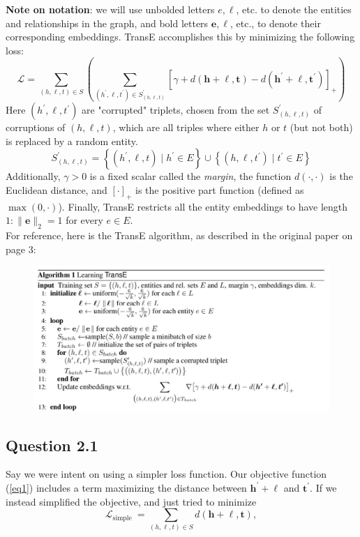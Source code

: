 \documentclass{article}
\begin{document}
\textbf{Note on notation}: we will use unbolded letters $e, \ell$, etc. to denote the entities and relationships in the graph, and bold letters $\mathbf{e}, \boldsymbol{\ell}$, etc., to denote their corresponding embeddings.
TransE accomplishes this by minimizing the following loss:
\begin{equation}\label{eq1}
\mathcal{L}=\sum_{(h, \ell, t) \in S}\left(\sum_{\left(h^{\prime}, \ell, t^{\prime}\right) \in S_{(h, \ell, t)}^{\prime}}\left[\gamma+d(\mathbf{h}+\boldsymbol{\ell}, \mathbf{t})-d\left(\mathbf{h}^{\prime}+\boldsymbol{\ell}, \mathbf{t}^{\prime}\right)\right]_{+}\right)
\end{equation}
Here $\left(h^{\prime}, \ell, t^{\prime}\right)$ are "corrupted" triplets, chosen from the set $S_{(h, \ell, t)}^{\prime}$ of corruptions of $(h, \ell, t)$, which are all triples where either $h$ or $t$ (but not both) is replaced by a random entity.
$$
S_{(h, \ell, t)}^{\prime}=\left\{\left(h^{\prime}, \ell, t\right) \mid h^{\prime} \in E\right\} \cup\left\{\left(h, \ell, t^{\prime}\right) \mid t^{\prime} \in E\right\}
$$
Additionally, $\gamma>0$ is a fixed scalar called the \textit{margin}, the function $d(\cdot, \cdot)$ is the Euclidean distance, and $[\cdot]_{+}$ is the positive part function (defined as $\max (0, \cdot)$). Finally, TransE restricts all the entity embeddings to have length $1:\|\mathbf{e}\|_2=1$ for every $e \in E$.\\
For reference, here is the TransE algorithm, as described in the original paper on page 3:
\begin{figure}[H]
    \centering
    \includegraphics[width=1.0\textwidth]{algo2.png}
\end{figure}

\subsection*{Question 2.1}
Say we were intent on using a simpler loss function. Our objective function (\ref{eq1}) includes a term maximizing the distance between $\mathbf{h}^{\prime}+\boldsymbol{\ell}$ and $\mathbf{t}^{\prime}$. If we instead simplified the objective, and just tried to minimize
\begin{equation}\label{eq2}
\mathcal{L}_{\text {simple }}=\sum_{(h, \ell, t) \in S} d(\mathbf{h}+\boldsymbol{\ell}, \mathbf{t}),
\end{equation}
\end{document}
